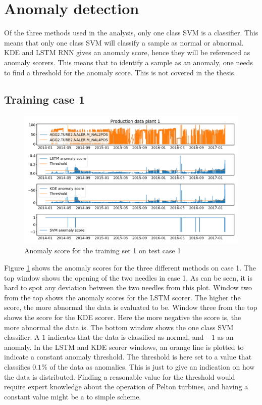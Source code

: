     \section{Anomaly detection}
        Of the three methods used in the analysis, only one class SVM is a classifier. This means that only one class SVM will classify a sample as normal or abnormal. KDE and LSTM RNN gives an anomaly score, hence they will be referenced as anomaly scorers. This means that to identify a sample as an anomaly, one needs to find a threshold for the anomaly score. This is not covered in the thesis.  
        
    \subsection{Training case 1}
        \begin{figure}
            \centering
            \includegraphics[width = \textwidth]{report/figures/analysis/plant1_training/production_data_anomaly.png}
            \caption{Anomaly score for the training set 1 on test case 1}
            \label{fig:anomaly_plant_1_train_production}
        \end{figure}
        Figure \ref{fig:anomaly_plant_1_train_production} shows the anomaly scores for the three different methods on case 1. The top window shows the opening of the two needles in case 1. As can be seen, it is hard to spot any deviation between the two needles from this plot. Window two from the top shows the anomaly scores for the LSTM scorer. The higher the score, the more abnormal the data is evaluated to be. Window three from the top shows the score for the KDE scorer. Here the more negative the score is, the more abnormal the data is. The bottom window shows the one class SVM classifier. A $1$ indicates that the data is classified as normal, and $-1$ as an anomaly. In the LSTM and KDE scorer windows, an orange line is plotted to indicate a constant anomaly threshold. The threshold is here set to a value that classifies $0.1\%$ of the data as anomalies. This is just to give an indication on how the data is distributed. Finding a reasonable value for the threshold would require expert knowledge about the operation of Pelton turbines, and having a constant value might be a to simple scheme. 
        
